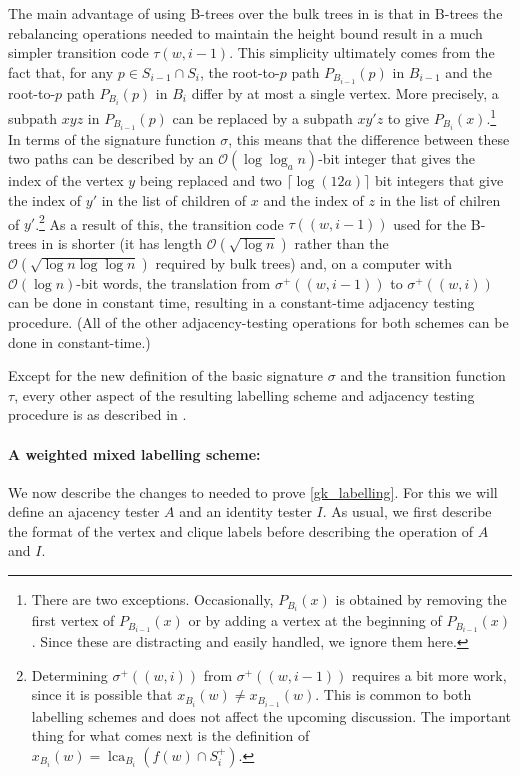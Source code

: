 \documentclass{patmorin}
\DeclareMathOperator{\lca}{lca}
\newcommand{\Oh}{\mathcal{O}}
\begin{document}
  The main advantage of using B-trees over the bulk trees in \cite{dujmovic.esperet.ea:adjacency} is that in B-trees the rebalancing operations needed to maintain the height bound result in a much simpler transition code $\tau(w,i-1)$.
  This simplicity ultimately comes from the fact that, for any $p\in S_{i-1}\cap S_i$, the root-to-$p$ path $P_{B_{i-1}}(p)$ in $B_{i-1}$ and the root-to-$p$ path $P_{B_i}(p)$ in $B_i$ differ by at most a single vertex.
  More precisely, a subpath $xyz$ in $P_{B_{i-1}}(p)$ can be replaced by a subpath $xy'z$ to give $P_{B_i}(x)$.\footnote{There are two exceptions.
  Occasionally, $P_{B_i}(x)$ is obtained by removing the first vertex of $P_{B_{i-1}}(x)$ or by adding a vertex at the beginning of $P_{B_{i-1}}(x)$.
  Since these are distracting and easily handled, we ignore them here.}  In terms of the signature function $\sigma$, this means that the difference between these two paths can be described by an $\Oh(\log\log_a n)$-bit integer that gives the index of the vertex $y$ being replaced and two $\lceil\log (12a)\rceil$ bit integers that give the index of $y'$ in the list of children of $x$ and the index of $z$ in the list of chilren of $y'$.\footnote{Determining $\sigma^+((w,i))$ from $\sigma^+((w,i-1))$ requires a bit more work, since it is possible that $x_{B_i}(w)\neq x_{B_{i-1}}(w)$.
  This is common to both labelling schemes and does not affect the upcoming discussion.
  The important thing for what comes next is the definition of $x_{B_i}(w)=\lca_{B_i}(f(w)\cap S^+_i)$.}  As a result of this, the transition code $\tau((w,i-1))$ used for the B-trees in \cite{gawrychowski.janczewski:simpler} is shorter (it has length $\Oh(\sqrt{\log n})$ rather than the $\Oh(\sqrt{\log n\log\log n})$ required by bulk trees) and, on a computer with $\Oh(\log n)$-bit words, the translation from $\sigma^+((w,i-1))$ to $\sigma^+((w,i))$ can be done in constant time, resulting in a constant-time adjacency testing procedure.
  (All of the other adjacency-testing operations for both schemes can be done in constant-time.)

  Except for the new definition of the basic signature $\sigma$ and the transition function $\tau$, every other aspect of the resulting labelling scheme and adjacency testing procedure is as described in \cite{dujmovic.esperet.ea:adjacency}.

  \paragraph{A weighted mixed labelling scheme:}
  We now describe the changes to \cite{gawrychowski.janczewski:simpler,dujmovic.esperet.ea:adjacency} needed to prove \cref{gk_labelling}.  For this we will define an ajacency tester $A$ and an identity tester $I$. As usual, we first describe the format of the vertex and clique labels before describing the operation of $A$ and $I$.
\end{document}
